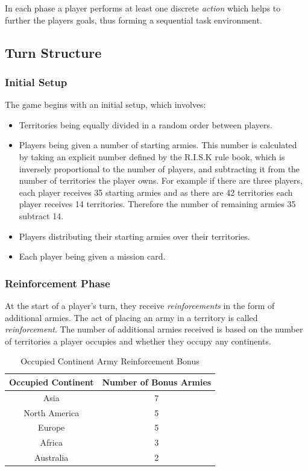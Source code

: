 \documentclass[parskip]{cs4rep}
\begin{document}
In each phase a player performs at least one discrete \textit{action} which helps to further the players goals, thus forming a sequential task environment.

\subsection{Turn Structure}

\subsubsection{Initial Setup}

The game begins with an initial setup, which involves:

\begin{itemize}
\item
Territories being equally divided in a random order between players.
\item
Players being given a number of starting armies. This number is calculated by taking an explicit number defined by the R.I.S.K rule book, which is inversely proportional to the number of players, and subtracting it from the number of territories the player owns. For example if there are three players, each player receives 35 starting armies and as there are 42 territories each player receives 14 territories. Therefore the number of remaining armies 35 subtract 14.
\item
Players distributing their starting armies over their territories.
\item
Each player being given a mission card.
\end{itemize}

\subsubsection{Reinforcement Phase}

At the start of a player's turn, they receive \textit{reinforcements} in the form of additional armies. The act of placing an army in a territory is called \textit{reinforcement}.  The number of additional armies received is based on the number of territories a player occupies and whether they occupy any continents.

\begin{table}[ht]
\centering
\begin{tabular}{|c|c|}
\hline 
\textbf{Occupied Continent} & \textbf{Number of Bonus Armies} \\ 
\hline 
Asia & 7 \\ 
\hline 
North America & 5 \\ 
\hline 
Europe & 5 \\ 
\hline 
Africa & 3 \\
\hline
Australia & 2 \\
\hline
\end{tabular}{}
\caption{Occupied Continent Army Reinforcement Bonus}
\label{table:continent-bonus}
\end{table}
\end{document}
